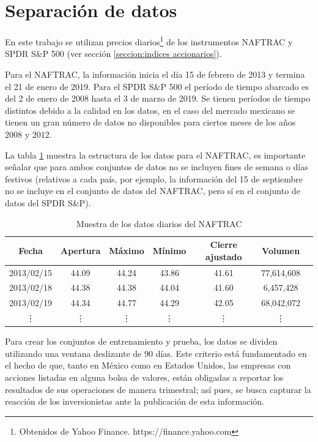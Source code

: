 \documentclass[12pt]{report}
\theoremstyle{break}
\theoremstyle{break}
\begin{document}
\section{Separación de datos}
\label{seccion:separacion de datos}
En este trabajo se utilizan precios diarios\footnote{Obtenidos de Yahoo Finance. https://finance.yahoo.com} de los instrumentos NAFTRAC y SPDR S\&P 500 (ver sección \ref{seccion:indices accionarios}).

Para el NAFTRAC, la información inicia el día 15 de febrero de 2013 y termina el 21 de enero de 2019. Para el SPDR S\&P 500 el período de tiempo abarcado es del 2 de enero de 2008 hasta  el 3 de marzo de 2019. Se tienen períodos de tiempo distintos debido a la calidad en los datos, en el caso del mercado mexicano se tienen un gran número de datos no disponibles para ciertos meses de los años $2008$ y $2012$.

La tabla \ref{tabla:Ejemplo datos diarios NAFTRAC} muestra la estructura de los datos para el NAFTRAC, es importante señalar que para ambos conjuntos de datos no se incluyen fines de semana o días festivos (relativos a cada país, por ejemplo, la información del 15 de septiembre no se incluye en el conjunto de datos del NAFTRAC, pero sí en el conjunto de datos del SPDR S\&P).

\begin{table}[h]
\centering
\begin{tabular}{ccccccc}
\hline
\textbf{Fecha} & \textbf{Apertura} & \textbf{Máximo} & \textbf{Mínimo} & \textbf{Cierre  ajustado} &  \textbf{Volumen} \\
\hline
2013/02/15 & 44.09 & 44.24 & 43.86  & 41.61 & 77,614,608\\
2013/02/18 & 44.38 & 44.38 & 44.04  & 41.60 & 6,457,428\\
2013/02/19 & 44.34 & 44.77 & 44.29  & 42.05 & 68,042,072\\
\vdots & \vdots & \vdots & \vdots  & \vdots & \vdots \\
\hline
\end{tabular}
\caption{\label{tabla:Ejemplo datos diarios NAFTRAC} Muestra de los datos diarios del NAFTRAC}
\end{table}

Para crear los conjuntos de entrenamiento y prueba, los datos se dividen utilizando una ventana deslizante de 90 días. Este criterio está fundamentado en el hecho de que, tanto en México como en Estados Unidos, las empresas con acciones listadas en alguna bolsa de valores, están obligadas a reportar los resultados de sus operaciones de manera trimestral; así pues, se busca capturar la reacción de los inversionistas ante la publicación de esta información.
\end{document}
